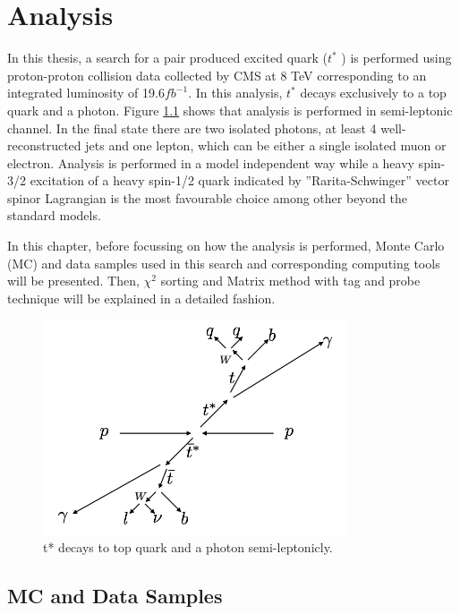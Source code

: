 \documentclass[12pt,oneandhalf,chaparabic,phys,ms,eng]{metu}
\begin{document}
\chapter{Analysis}

In this thesis, a search for a pair produced excited quark ($t^*$ ) is performed using proton-proton collision data collected by CMS at 8 TeV corresponding to an integrated luminosity of 19.6${fb}^{-1}$. In this analysis, $t^*$ decays exclusively to a top quark and a photon. Figure \ref{signal} shows that analysis is performed in semi-leptonic channel. In the final state  there are two isolated photons, at least 4 well-reconstructed jets and one lepton, which can be either a single isolated muon or electron. Analysis is performed in a model independent way while a heavy spin-3/2 excitation of a heavy spin-1/2 quark indicated by ”Rarita-Schwinger” vector spinor Lagrangian is the most favourable choice among other beyond the standard models.

In this chapter, before focussing on how the analysis is performed, Monte Carlo (MC) and data samples used in this search and corresponding computing tools will be presented. Then, ${\chi}^2$ sorting and Matrix method with tag and probe technique will be explained in a detailed fashion.

\begin{figure}[!hbt]
\centering
    \includegraphics[width=0.8\textwidth]{signal}
    \caption{\label{signal} t* decays to top quark and a photon semi-leptonicly.}
\end{figure}

\section{MC and Data Samples}
\end{document}
